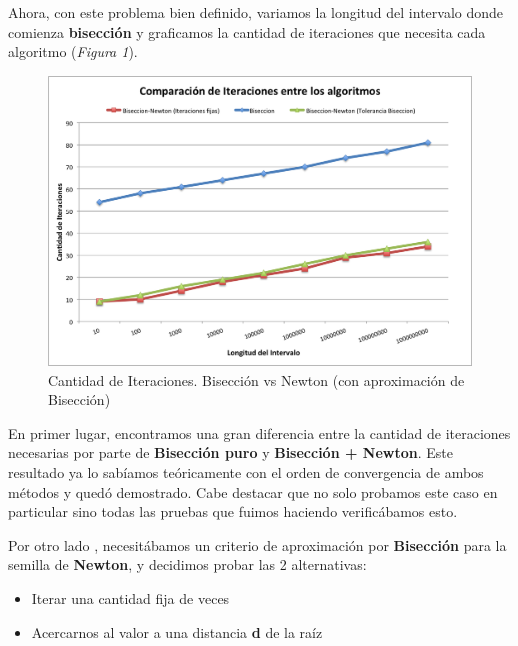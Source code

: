\documentclass[a4paper]{article}
\begin{document}
Ahora, con este problema bien definido, variamos la longitud del intervalo donde comienza \textbf{bisección} y graficamos la cantidad de iteraciones que necesita cada algoritmo (\textit{Figura 1}).

\begin{figure}[H]
  \centering
  \includegraphics[scale=0.80]{graficos/1-Biseccion_vs_BiseccionNewton.png}
  \caption{Cantidad de Iteraciones. Bisección vs Newton (con aproximación de Bisección) }
\end{figure}

En primer lugar, encontramos una gran diferencia entre la cantidad de iteraciones necesarias por parte de \textbf{Bisección puro} y \textbf{Bisección + Newton}. Este resultado ya lo sabíamos teóricamente con el orden de convergencia de ambos métodos y quedó demostrado. Cabe destacar que no solo probamos este caso en particular sino todas las pruebas que fuimos haciendo verificábamos esto.\\ \vspace{1em}
 
Por otro lado , necesitábamos un criterio de aproximación por \textbf{Bisección} para la semilla de \textbf{Newton}, y decidimos probar las 2 alternativas:
\begin{itemize}
  \item Iterar una cantidad fija de veces
  \item Acercarnos al valor a una distancia \textbf{d} de la raíz
\end{itemize}
\end{document}

